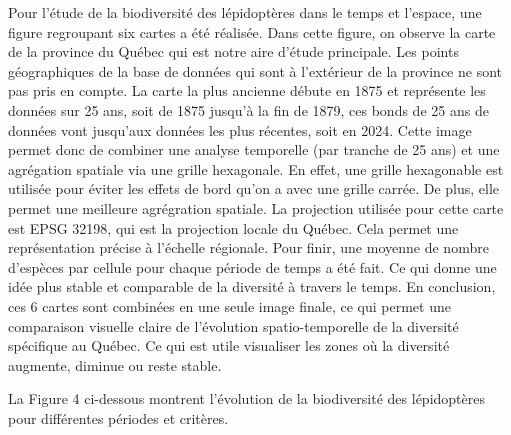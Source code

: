 \documentclass[9pt,twocolumn,twoside,]{pnas-new}
\begin{document}
Pour l'étude de la biodiversité des lépidoptères dans le temps et
l'espace, une figure regroupant six cartes a été réalisée. Dans cette
figure, on observe la carte de la province du Québec qui est notre aire
d'étude principale. Les points géographiques de la base de données qui
sont à l'extérieur de la province ne sont pas pris en compte. La carte
la plus ancienne débute en 1875 et représente les données sur 25 ans,
soit de 1875 jusqu'à la fin de 1879, ces bonds de 25 ans de données vont
jusqu'aux données les plus récentes, soit en 2024. Cette image permet
donc de combiner une analyse temporelle (par tranche de 25 ans) et une
agrégation spatiale via une grille hexagonale. En effet, une grille
hexagonable est utilisée pour éviter les effets de bord qu'on a avec une
grille carrée. De plus, elle permet une meilleure agrégration spatiale.
La projection utilisée pour cette carte est EPSG 32198, qui est la
projection locale du Québec. Cela permet une représentation précise à
l'échelle régionale. Pour finir, une moyenne de nombre d'espèces par
cellule pour chaque période de temps a été fait. Ce qui donne une idée
plus stable et comparable de la diversité à travers le temps. En
conclusion, ces 6 cartes sont combinées en une seule image finale, ce
qui permet une comparaison visuelle claire de l'évolution
spatio-temporelle de la diversité spécifique au Québec. Ce qui est utile
visualiser les zones où la diversité augmente, diminue ou reste stable.

La Figure 4 ci-dessous montrent l'évolution de la biodiversité des
lépidoptères pour différentes périodes et critères.
\end{document}
